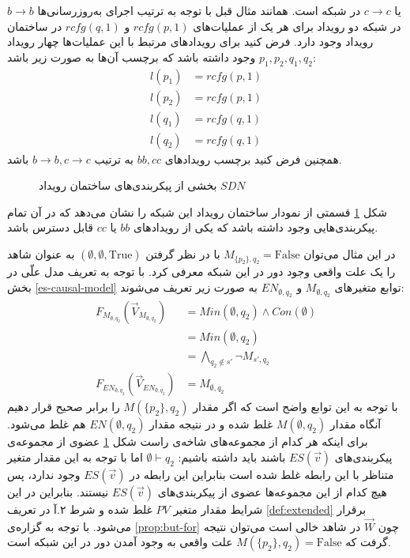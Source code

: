 \documentclass[
msc,
irfonts
]{./tex/tehran-thesis}
\newcommand{\پ}{پروژه/پایان‌نامه/رساله }
\theoremstyle{definition}
\theoremstyle{theorem}
\theoremstyle{definition}
\numberwithin{algorithm}{chapter}
\newcommand{\F}{\mathrm{False}}
\newcommand{\T}{\mathrm{True}}
\newcommand{\s}[1]{\{#1\}}
\newcommand{\e}{\emptyset}
\newcommand{\ra}{\rightarrow}
\newcommand{\crd}[4][above]{
    \node[draw,circle,inner sep=2pt,fill,label={[#1]:#4}] at (#2,#3) {};
}
\newcommand{\f}[1]{F_{#1}(\vec V_{#1})}
\begin{document}
$b \ra b$
یا
$c \ra c$
در شبکه است.
همانند مثال قبل با توجه به ترتیب اجرای به‌روز‌رسانی‌ها در شبکه دو رویداد برای هر یک از عملیات‌های
$rcfg(p,1)$
و
$rcfg(q,1)$
در ساختمان رویداد وجود دارد.
فرض کنید برای رویداد‌های مرتبط با این عملیات‌ها چهار رویداد
$p_1,p_2,q_1,q_2$
وجود داشته باشد که برچسب آن‌ها به صورت زیر باشد:
\begin{align*}
    l(p_1) & = rcfg(p,1) \\
    l(p_2) & = rcfg(p,1) \\
    l(q_1) & = rcfg(q,1) \\
    l(q_2) & = rcfg(q,1)
\end{align*}
همچنین فرض کنید برچسب رویداد‌های
$bb,cc$
به ترتیب
$b\ra b,c\ra c$
باشد.
\begin{figure}
    \centering
    \caption{
        بخشی از پیکربندی‌های ساختمان رویداد 
        $SDN$
    }
    \label{fig:loop:es}
\end{figure}
شکل
\ref{fig:loop:es}
قسمتی از نمودار ساختمان رویداد این شبکه را نشان می‌دهد که در آن تمام پیکر‌بندی‌هایی وجود داشته باشد که یکی از رویداد‌های
$bb$
یا
$cc$
قابل دسترس باشد.

در این مثال می‌توان
$M_{\s{p_2},q_2}= \F$
با در نظر گرفتن
$(\e,\e,\T)$
به عنوان شاهد را یک علت واقعی وجود دور در این شبکه
معرفی کرد.
با توجه به تعریف مدل علّی در بخش
\ref{es-causal-model}
توابع متغیر‌های
$M_{\e,q_2}$
و
$EN_{\e,q_2}$
به صورت زیر تعریف می‌شوند:
\begin{align*}
    \f{M_{\e,q_2}}  & = Min(\e,q_2) \wedge Con(\e) \\
                    & = Min(\e,q_2)                \\
                    & =  \bigwedge_{q_2 \notin s'}
    \neg M_{s',q_2}                                \\
    \f{EN_{\e,q_2}} & = M_{\e,q_2}
\end{align*}
با توجه به این توابع واضح است که 
اگر مقدار
$M(\s{p_2},q_2)$
را برابر صحیح قرار دهیم آنگاه مقدار
$M(\e,q_2)$
غلط شده و در نتیجه مقدار
$EN(\e,q_2)$
هم غلط می‌شود.
برای اینکه هر کدام از مجموعه‌های شاخه‌ی راست شکل
\ref{fig:loop:es}
عضوی از مجموعه‌ی پیکربندی‌های 
$ES(\vec v)$
باشند باید داشته باشیم:
$\e \vdash q_2$
اما با توجه به این مقدار متغیر متناظر با این رابطه غلط شده است بنابراین این رابطه در 
$ES(\vec v)$
وجود ندارد، پس هیچ کدام از این مجموعه‌ها عضوی از پیکربندی‌های 
$ES(\vec v)$
نیستند.
بنابراین در این شرایط مقدار متغیر 
$PV$
غلط شده و شرط ۲.آ در تعریف 
\ref{def:extended}
برقرار می‌شود.
با توجه به گزاره‌ی 
\ref{prop:but-for}
چون
$\vec W$
در شاهد خالی است می‌توان نتیجه گرفت که
$M(\s{p_2},q_2) = \F$
علت واقعی به وجود آمدن دور در این شبکه است.
 
\end{document}
